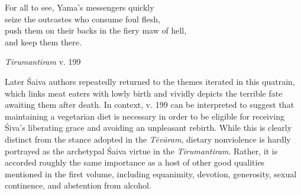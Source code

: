\begin{pullquote}


	
	    For all to see, Yama’s messengers quickly\\
	    seize the outcastes who consume foul flesh,\\
	    push them on their backs in the fiery maw of hell,\\
	    and keep them there.\footnotemark{}
	  

\medskip\hfill\begin{minipage}{0.9\textwidth}\small\hfill
\emph{{Tirumantiram}} v. 199\end{minipage}\hspace{2em}
\end{pullquote}

Later Śaiva authors repeatedly returned to the themes iterated in this quatrain, which links meat eaters with lowly birth and vividly depicts the terrible fate awaiting them after death. In context, v. 199 can be interpreted to suggest that maintaining a vegetarian diet is necessary in order to be eligible for receiving Śiva’s liberating grace and avoiding an unpleasant rebirth. While this is clearly distinct from the stance adopted in the \emph{{Tēvāram}}, dietary nonviolence is hardly portrayed as the archetypal Śaiva virtue in the \emph{{Tirumantiram}}. Rather, it is accorded roughly the same importance as a host of other good qualities mentioned in the first volume, including equanimity, devotion, generosity, sexual continence, and abstention from alcohol.


